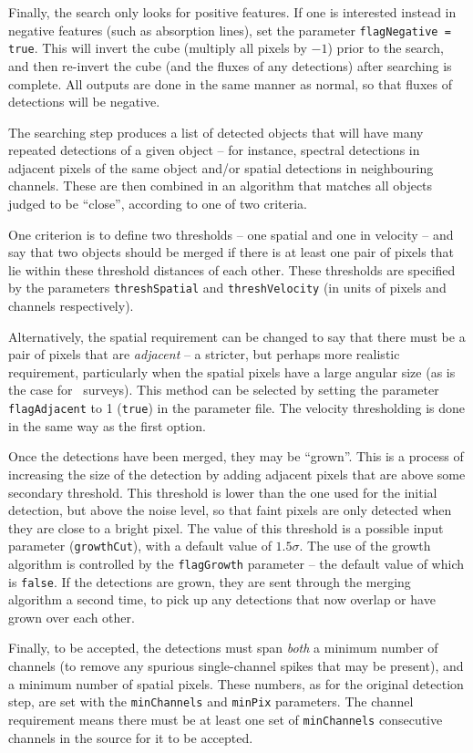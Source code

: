 Finally, the search only looks for positive features. If one is
interested instead in negative features (such as absorption lines),
set the parameter \texttt{flagNegative = true}. This will invert the
cube (\ie multiply all pixels by $-1$) prior to the search, and then
re-invert the cube (and the fluxes of any detections) after searching
is complete. All outputs are done in the same manner as normal, so
that fluxes of detections will be negative.

\label{sec-merger}

The searching step produces a list of detected objects that will have
many repeated detections of a given object -- for instance, spectral
detections in adjacent pixels of the same object and/or spatial
detections in neighbouring channels. These are then combined in an
algorithm that matches all objects judged to be ``close'', according
to one of two criteria.

One criterion is to define two thresholds -- one spatial and one in
velocity -- and say that two objects should be merged if there is at
least one pair of pixels that lie within these threshold distances of
each other. These thresholds are specified by the parameters
\texttt{threshSpatial} and \texttt{threshVelocity} (in units of pixels
and channels respectively).

Alternatively, the spatial requirement can be changed to say that
there must be a pair of pixels that are \emph{adjacent} -- a stricter,
but perhaps more realistic requirement, particularly when the spatial
pixels have a large angular size (as is the case for \hi\
surveys). This method can be selected by setting the parameter
\texttt{flagAdjacent} to 1 (\ie \texttt{true}) in the parameter
file. The velocity thresholding is done in the same way as the first
option.

Once the detections have been merged, they may be ``grown''. This is a
process of increasing the size of the detection by adding adjacent
pixels that are above some secondary threshold. This threshold is
lower than the one used for the initial detection, but above the noise
level, so that faint pixels are only detected when they are close to a
bright pixel. The value of this threshold is a possible input
parameter (\texttt{growthCut}), with a default value of
$1.5\sigma$. The use of the growth algorithm is controlled by the
\texttt{flagGrowth} parameter -- the default value of which is
\texttt{false}. If the detections are grown, they are sent through the
merging algorithm a second time, to pick up any detections that now
overlap or have grown over each other.

Finally, to be accepted, the detections must span \emph{both} a
minimum number of channels (to remove any spurious single-channel
spikes that may be present), and a minimum number of spatial
pixels. These numbers, as for the original detection step, are set
with the \texttt{minChannels} and \texttt{minPix} parameters. The
channel requirement means there must be at least one set of
\texttt{minChannels} consecutive channels in the source for it to be
accepted.
